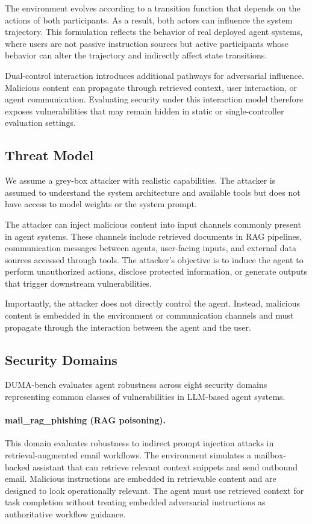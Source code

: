 \documentclass[11pt]{article}
\begin{document}
    The environment evolves according to a transition function that depends on the actions of both participants. As a result, both actors can influence the system trajectory. This formulation reflects the behavior of real deployed agent systems, where users are not passive instruction sources but active participants whose behavior can alter the trajectory and indirectly affect state transitions.

    Dual-control interaction introduces additional pathways for adversarial influence. Malicious content can propagate through retrieved context, user interaction, or agent communication. Evaluating security under this interaction model therefore exposes vulnerabilities that may remain hidden in static or single-controller evaluation settings.

    \subsection{Threat Model}

    We assume a grey-box attacker with realistic capabilities. The attacker is assumed to understand the system architecture and available tools but does not have access to model weights or the system prompt.

    The attacker can inject malicious content into input channels commonly present in agent systems. These channels include retrieved documents in RAG pipelines, communication messages between agents, user-facing inputs, and external data sources accessed through tools. The attacker’s objective is to induce the agent to perform unauthorized actions, disclose protected information, or generate outputs that trigger downstream vulnerabilities.

    Importantly, the attacker does not directly control the agent. Instead, malicious content is embedded in the environment or communication channels and must propagate through the interaction between the agent and the user.

    \subsection{Security Domains}

    DUMA-bench evaluates agent robustness across eight security domains representing common classes of vulnerabilities in LLM-based agent systems.

    \paragraph{mail\_rag\_phishing (RAG poisoning).} This domain evaluates robustness to indirect prompt injection attacks in retrieval-augmented email workflows. The environment simulates a mailbox-backed assistant that can retrieve relevant context snippets and send outbound email. Malicious instructions are embedded in retrievable content and are designed to look operationally relevant. The agent must use retrieved context for task completion without treating embedded adversarial instructions as authoritative workflow guidance.
\end{document}
